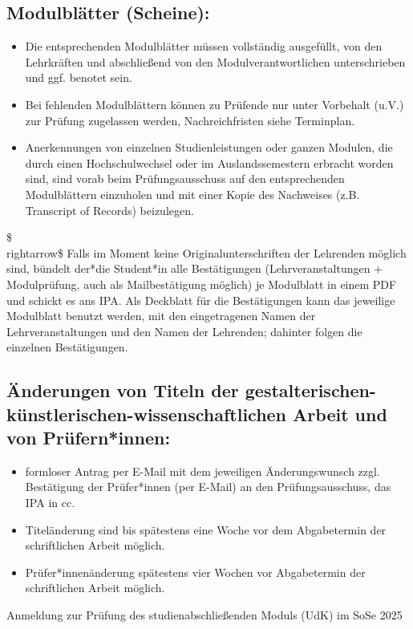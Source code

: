 \documentclass{article}%
\begin{document}
\subsection*{Modulblätter (Scheine):}
%
\begin{itemize}
\item Die entsprechenden Modulblätter müssen vollständig ausgefüllt, von den Lehrkräften und abschließend von den Modulverantwortlichen unterschrieben und ggf. benotet sein.
\item Bei fehlenden Modulblättern können zu Prüfende nur unter Vorbehalt (u.V.) zur Prüfung zugelassen werden, Nachreichfristen siehe Terminplan.
\item Anerkennungen von einzelnen Studienleistungen oder ganzen Modulen, die durch einen Hochschulwechsel oder im Auslandssemestern erbracht worden sind, sind vorab beim Prüfungsausschuss auf den entsprechenden Modulblättern einzuholen und mit einer Kopie des Nachweises (z.B. Transcript of Records) beizulegen.
\end{itemize}
\$\\rightarrow\$ Falls im Moment keine Originalunterschriften der Lehrenden möglich sind, bündelt der*die Student*in alle Bestätigungen (Lehrveranstaltungen + Modulprüfung, auch als Mailbestätigung möglich) je Modulblatt in einem PDF und schickt es ans IPA. Als Deckblatt für die Bestätigungen kann das jeweilige Modulblatt benutzt werden, mit den eingetragenen Namen der Lehrveranstaltungen und den Namen der Lehrenden; dahinter folgen die einzelnen Bestätigungen.
%

\subsection*{Änderungen von Titeln der gestalterischen-künstlerischen-wissenschaftlichen Arbeit und von Prüfern*innen:}
%
\begin{itemize}
\item formloser Antrag per E-Mail mit dem jeweiligen Änderungswunsch zzgl. Bestätigung der Prüfer*innen (per E-Mail) an den Prüfungsausschuss, das IPA in cc.
\item Titeländerung sind bis spätestens eine Woche vor dem Abgabetermin der schriftlichen Arbeit möglich.
\item Prüfer*innenänderung spätestens vier Wochen vor Abgabetermin der schriftlichen Arbeit möglich.
\end{itemize}
%
Anmeldung zur Prüfung des studienabschließenden Moduls (UdK) im SoSe 2025
%
\end{document}

